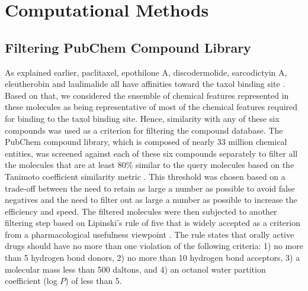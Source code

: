 \documentclass[11pt]{report}
\begin{document}
\section{Computational Methods}
\label{s:VS-Methods}

\subsection{Filtering PubChem Compound Library}
\label{ss:VS-Methods_Filtering}

As explained earlier, paclitaxel, epothilone A, discodermolide, sarcodictyin A, eleutherobin and laulimalide all have affinities toward the taxol binding site 
\cite{Bollag1995,Hamel1999,Kowalski1997,Buey2005,Pineda2004,Khrapunovich-Baine2011}. 
Based on that, we considered the ensemble of chemical features represented in these molecules as being representative of most of the chemical features required for binding to the taxol binding site. Hence, similarity with any of these six compounds was used as a criterion for filtering the compound database. The PubChem compound library, which is composed of nearly 33 million chemical entities, was screened against each of these six compounds separately to filter all the molecules that are at least 80\% similar to the query molecules based on the Tanimoto coefficient similarity metric \cite{Nikolova2003}. This threshold was chosen based on a trade-off between
the need to retain as large a number as possible to avoid false negatives
and the need to filter out as large a number as possible to increase the efficiency and speed.
The filtered molecules were then subjected to another filtering step based on Lipinski's rule of five that is widely accepted as a criterion from a pharmacological usefulness viewpoint
\cite{Lipinski2001}. The rule states that orally active drugs should have no more
than one violation of the following criteria: 1) no more than 5 hydrogen bond donors, 2) no more than 10 hydrogen bond acceptors, 3) a molecular mass
less than 500 daltons, and 4) an octanol water partition coefficient (log $P$) 
of less than 5.
\end{document}
